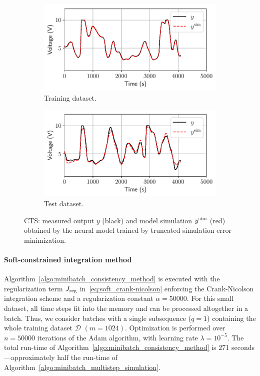 \documentclass{article} %
\newcommand{\batchsize}{q}
\newcommand{\seqlen}{m}
\newcommand{\numiter}{n}
\newcommand{\Did}{{\mathcal{D}}}
\begin{document}
\begin{figure}
\centering
\begin{subfigure}{.5\textwidth}
  \centering
  \includegraphics[width=\linewidth]{fig/CTS/CTS_id_model_SS_128step.pdf}
  \caption{Training dataset.}
  \label{fig:sub1}
\end{subfigure}%
\begin{subfigure}{.5\textwidth}
  \centering
  \includegraphics[width=\linewidth]{fig/CTS/CTS_test_model_SS_128step.pdf}
  \caption{Test dataset.}
  \label{fig:sub2}
\end{subfigure}
\caption{CTS: measured output $y$ (black) and model simulation $y^{\rm sim}$ (red) obtained by the neural model trained by truncated simulation error minimization.} %
\label{fig:CTS_model_custom_SS_128step.pdf}
\end{figure}

\paragraph{Soft-constrained integration method}
Algorithm~\ref{algo:minibatch_consistency_method} is executed with the regularization term $J_{\rm reg}$ in~\eqref{eq:soft_crank-nicolson} enforcing the Crank-Nicolson integration scheme  and a regularization constant $\alpha=50000$.
For this small dataset, all time steps fit into the memory and can be processed altogether in a batch. Thus, we consider batches with  a single subsequence ($\batchsize=1$) containing the whole training dataset $\Did$ $(\seqlen = 1024)$. Optimization is performed over $\numiter=50000$ iterations of the Adam algorithm, with learning rate $\lambda=10^{-5}$. The total run-time of Algorithm~\ref{algo:minibatch_consistency_method} is 271 seconds---approximately half the run-time of Algorithm~\ref{algo:minibatch_multistep_simulation}.
\end{document}
